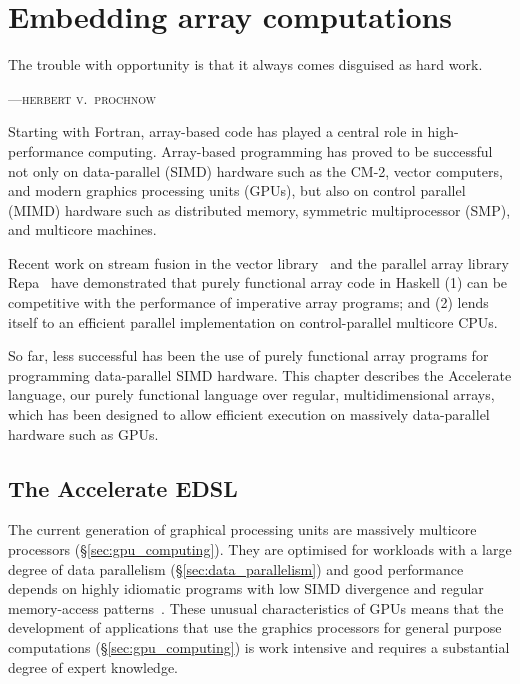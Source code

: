 
\chapter{Embedding array computations}
\label{ch:accelerate}

\epigraph{The trouble with opportunity is that it always comes disguised as hard work.}%
{\textsc{---herbert v.\ prochnow}}


Starting with Fortran, array-based code has played a central role in
high-performance computing. Array-based programming has proved to be successful
not only on data-parallel (SIMD) hardware such as the CM-2, vector computers,
and modern graphics processing units (GPUs), but also on control parallel (MIMD)
hardware such as distributed memory, symmetric multiprocessor (SMP), and
multicore machines.

Recent work on stream fusion in the vector
library~\cite{Coutts:2007kp,Mainland:2013ez} and the parallel array library
Repa~\cite{Keller:2010er,Lippmeier:2011cd,Lippmeier:2012gx} have demonstrated
that purely functional array code in Haskell (1) can be competitive with the
performance of imperative array programs; and (2) lends itself to an efficient
parallel implementation on control-parallel multicore CPUs.

So far, less successful has been the use of purely functional array programs for
programming data-parallel SIMD hardware. This chapter describes the Accelerate
language, our purely functional language over regular, multidimensional arrays,
which has been designed to allow efficient execution on massively data-parallel
hardware such as GPUs.


\section{The Accelerate EDSL}
\label{sec:accelerate}

The current generation of graphical processing units are massively multicore
processors (\S\ref{sec:gpu_computing}). They are optimised for workloads with a
large degree of data parallelism (\S\ref{sec:data_parallelism}) and good
performance depends on highly idiomatic programs with low SIMD divergence and
regular memory-access patterns~\cite{NVIDIA:2012wf}. These unusual
characteristics of GPUs means that the development of applications that use the
graphics processors for general purpose computations (\S\ref{sec:gpu_computing})
is work intensive and requires a substantial degree of expert knowledge.

